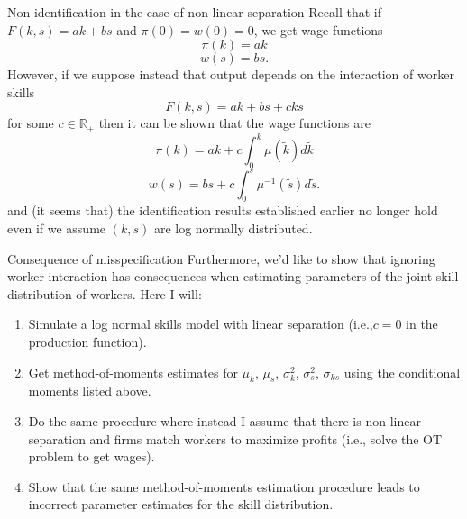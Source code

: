 \documentclass{beamer}
\begin{document}
	\begin{frame}{Non-identification in the case of non-linear separation}
		Recall that if $F(k,s) = ak + bs$ and $\pi(0)=w(0)=0$, we get wage functions
		\begin{equation*}
			\pi(k) = ak
		\end{equation*}
		\begin{equation*}
			w(s) = bs.
		\end{equation*}
		However, if we suppose instead that output depends on the interaction of worker skills
		\begin{equation*}
			F(k,s)= ak + bs + cks
		\end{equation*}
		for some $c\in\mathbb{R}_+$ then it can be shown that the wage functions are
		\begin{equation*}
			\pi(k) = ak + c\int_0^k \mu(\tilde{k})d\tilde{k}
		\end{equation*}
		\begin{equation*}
			w(s) = bs + c\int_0^s\mu^{-1}(\tilde{s})d\tilde{s}.
		\end{equation*}
		and (it seems that) the identification results established earlier no longer hold even if we assume $(k,s)$ are log normally distributed.
	
	\end{frame}
	
	\begin{frame}{Consequence of misspecification}
		Furthermore, we'd like to show that ignoring worker interaction has consequences when estimating parameters of the joint skill distribution of workers. Here I will:
		\bigskip
		
		\begin{enumerate}
			\item Simulate a log normal skills model with linear separation (i.e.,$c=0$ in the production function).
			\bigskip
			\item Get method-of-moments estimates for $\mu_k$, $\mu_s$, $\sigma_k^2$, $\sigma_s^2$, $\sigma_{ks}$ using the conditional moments listed above.
			\bigskip
			\item Do the same procedure where instead I assume that there is non-linear separation and firms match workers to maximize profits (i.e., solve the OT problem to get wages).
			\bigskip
			\item Show that the same method-of-moments estimation procedure leads to incorrect parameter estimates for the skill distribution. 
		\end{enumerate}
	\end{frame}
	
\end{document}
